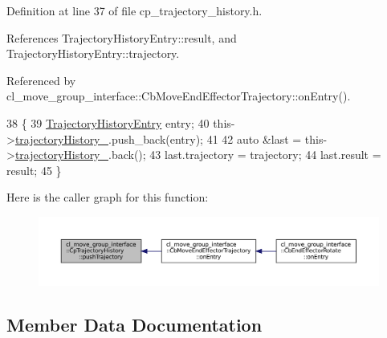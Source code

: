 Definition at line 37 of file cp\+\_\+trajectory\+\_\+history.\+h.



References Trajectory\+History\+Entry\+::result, and Trajectory\+History\+Entry\+::trajectory.



Referenced by cl\+\_\+move\+\_\+group\+\_\+interface\+::\+Cb\+Move\+End\+Effector\+Trajectory\+::on\+Entry().


\begin{DoxyCode}
38         \{
39             \hyperlink{structTrajectoryHistoryEntry}{TrajectoryHistoryEntry} entry;
40             this->\hyperlink{classcl__move__group__interface_1_1CpTrajectoryHistory_ac5f17b74ca856f6f8ccb96d9a4786fb2}{trajectoryHistory\_}.push\_back(entry);
41 
42             \textcolor{keyword}{auto} &last = this->\hyperlink{classcl__move__group__interface_1_1CpTrajectoryHistory_ac5f17b74ca856f6f8ccb96d9a4786fb2}{trajectoryHistory\_}.back();
43             last.trajectory = trajectory;
44             last.result = result;
45         \}
\end{DoxyCode}
Here is the caller graph for this function\+:
\nopagebreak
\begin{figure}[H]
\begin{center}
\leavevmode
\includegraphics[width=350pt]{classcl__move__group__interface_1_1CpTrajectoryHistory_a27de15d0d6c5633475c59cd2ee3e7793_icgraph}
\end{center}
\end{figure}


\subsection{Member Data Documentation}
\mbox{\label{classcl__move__group__interface_1_1CpTrajectoryHistory_ac5f17b74ca856f6f8ccb96d9a4786fb2}} 
